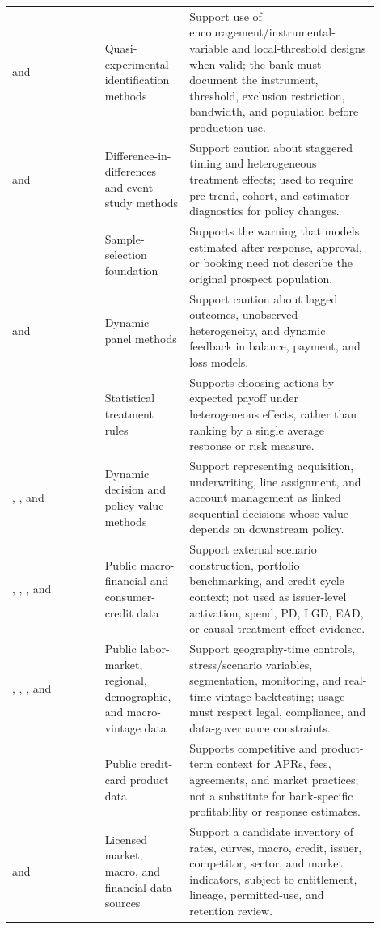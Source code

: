 \documentclass[11pt]{article}
\newcommand{\1}{\mathbf{1}}
\begin{document}
\begin{longtable}{p{0.23\linewidth}p{0.20\linewidth}p{0.47\linewidth}}
\citet{angristimbensrubin1996iv} and \citet{lee2010rd}
  & Quasi-experimental identification methods
  & Support use of encouragement/instrumental-variable and local-threshold
    designs when valid; the bank must document the instrument, threshold,
    exclusion restriction, bandwidth, and population before production use. \\
\citet{callaway2021did} and \citet{sun2021eventstudy}
  & Difference-in-differences and event-study methods
  & Support caution about staggered timing and heterogeneous treatment effects;
    used to require pre-trend, cohort, and estimator diagnostics for policy
    changes. \\
\citet{heckman1979selection}
  & Sample-selection foundation
  & Supports the warning that models estimated after response, approval, or
    booking need not describe the original prospect population. \\
\citet{arellano1991panel} and \citet{blundell1998initial}
  & Dynamic panel methods
  & Support caution about lagged outcomes, unobserved heterogeneity, and
    dynamic feedback in balance, payment, and loss models. \\
\citet{manski2004treatment}
  & Statistical treatment rules
  & Supports choosing actions by expected payoff under heterogeneous effects,
    rather than ranking by a single average response or risk measure. \\
\citet{puterman1994mdp}, \citet{murphy2003dynamic}, and
\citet{rust1987replacement}
  & Dynamic decision and policy-value methods
  & Support representing acquisition, underwriting, line assignment, and account
    management as linked sequential decisions whose value depends on downstream
    policy. \\
\citet{federalreserveEFA}, \citet{federalreserveG19},
\citet{federalreserveZ1}, and \citet{nyfedHhdc}
  & Public macro-financial and consumer-credit data
  & Support external scenario construction, portfolio benchmarking, and credit
    cycle context; not used as issuer-level activation, spend, PD, LGD, EAD, or
    causal treatment-effect evidence. \\
\citet{blsLAUS}, \citet{beaRegional}, \citet{censusACS},
and \citet{fredALFRED}
  & Public labor-market, regional, demographic, and macro-vintage data
  & Support geography-time controls, stress/scenario variables, segmentation,
    monitoring, and real-time-vintage backtesting; usage must respect legal,
    compliance, and data-governance constraints. \\
\citet{cfpbCreditCardData}
  & Public credit-card product data
  & Supports competitive and product-term context for APRs, fees, agreements,
    and market practices; not a substitute for bank-specific profitability or
    response estimates. \\
\citet{lsegWorkspace} and \citet{lsegEconomicData}
  & Licensed market, macro, and financial data sources
  & Support a candidate inventory of rates, curves, macro, credit, issuer,
    competitor, sector, and market indicators, subject to entitlement, lineage,
    permitted-use, and retention review. \\
\bottomrule
\end{longtable}
\end{document}
